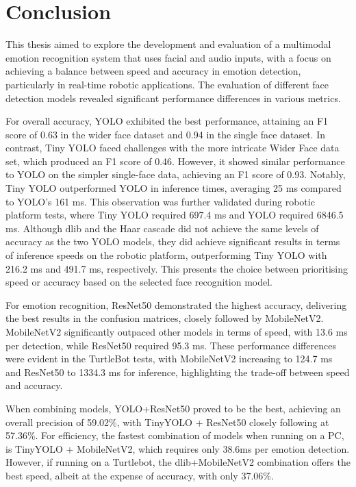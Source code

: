 \chapter{Conclusion}
This thesis aimed to explore the development and evaluation of a multimodal emotion recognition system that uses facial and audio inputs, with a focus on achieving a balance between speed and accuracy in emotion detection, particularly in real-time robotic applications. The evaluation of different face detection models revealed significant performance differences in various metrics. 

For overall accuracy, YOLO exhibited the best performance, attaining an F1 score of 0.63 in the wider face dataset and 0.94 in the single face dataset. In contrast, Tiny YOLO faced challenges with the more intricate Wider Face data set, which produced an F1 score of 0.46. However, it showed similar performance to YOLO on the simpler single-face data, achieving an F1 score of 0.93. Notably, Tiny YOLO outperformed YOLO in inference times, averaging 25 ms compared to YOLO's 161 ms. This observation was further validated during robotic platform tests, where Tiny YOLO required 697.4 ms and YOLO required 6846.5 ms. Although dlib and the Haar cascade did not achieve the same levels of accuracy as the two YOLO models, they did achieve significant results in terms of inference speeds on the robotic platform, outperforming Tiny YOLO with 216.2 ms and 491.7 ms, respectively. This presents the choice between prioritising speed or accuracy based on the selected face recognition model.

For emotion recognition, ResNet50 demonstrated the highest accuracy, delivering the best results in the confusion matrices, closely followed by MobileNetV2. MobileNetV2 significantly outpaced other models in terms of speed, with 13.6 ms per detection, while ResNet50 required 95.3 ms. These performance differences were evident in the TurtleBot tests, with MobileNetV2 increasing to 124.7 ms and ResNet50 to 1334.3 ms for inference, highlighting the trade-off between speed and accuracy.

When combining models, YOLO+ResNet50 proved to be the best, achieving an overall precision of 59.02\%, with TinyYOLO + ResNet50 closely following at 57.36\%. For efficiency, the fastest combination of models when running on a PC, is TinyYOLO + MobileNetV2, which requires only 38.6ms per emotion detection. However, if running on a Turtlebot, the dlib+MobileNetV2 combination offers the best speed, albeit at the expense of accuracy, with only 37.06\%.

